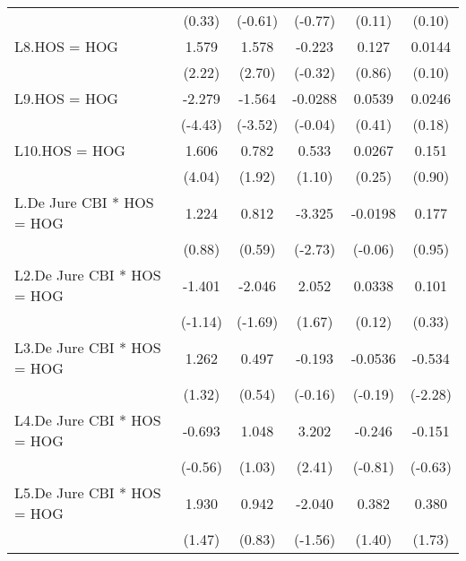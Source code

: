 {\begin{longtable}{l*{5}{c}}
                &   (0.33)         &  (-0.61)         &  (-0.77)         &   (0.11)         &   (0.10)         \\
[1em]
L8.HOS = HOG    &    1.579\sym{*}  &    1.578\sym{**} &   -0.223         &    0.127         &   0.0144         \\
                &   (2.22)         &   (2.70)         &  (-0.32)         &   (0.86)         &   (0.10)         \\
[1em]
L9.HOS = HOG    &   -2.279\sym{***}&   -1.564\sym{***}&  -0.0288         &   0.0539         &   0.0246         \\
                &  (-4.43)         &  (-3.52)         &  (-0.04)         &   (0.41)         &   (0.18)         \\
[1em]
L10.HOS = HOG   &    1.606\sym{***}&    0.782         &    0.533         &   0.0267         &    0.151         \\
                &   (4.04)         &   (1.92)         &   (1.10)         &   (0.25)         &   (0.90)         \\
[1em]
L.De Jure CBI * HOS = HOG&    1.224         &    0.812         &   -3.325\sym{**} &  -0.0198         &    0.177         \\
                &   (0.88)         &   (0.59)         &  (-2.73)         &  (-0.06)         &   (0.95)         \\
[1em]
L2.De Jure CBI * HOS = HOG&   -1.401         &   -2.046         &    2.052         &   0.0338         &    0.101         \\
                &  (-1.14)         &  (-1.69)         &   (1.67)         &   (0.12)         &   (0.33)         \\
[1em]
L3.De Jure CBI * HOS = HOG&    1.262         &    0.497         &   -0.193         &  -0.0536         &   -0.534\sym{*}  \\
                &   (1.32)         &   (0.54)         &  (-0.16)         &  (-0.19)         &  (-2.28)         \\
[1em]
L4.De Jure CBI * HOS = HOG&   -0.693         &    1.048         &    3.202\sym{*}  &   -0.246         &   -0.151         \\
                &  (-0.56)         &   (1.03)         &   (2.41)         &  (-0.81)         &  (-0.63)         \\
[1em]
L5.De Jure CBI * HOS = HOG&    1.930         &    0.942         &   -2.040         &    0.382         &    0.380         \\
                &   (1.47)         &   (0.83)         &  (-1.56)         &   (1.40)         &   (1.73)         \\

\end{longtable}}
